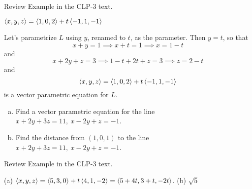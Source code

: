 \begin{hint}
Review Example  in the CLP-3 text.
\end{hint}

\begin{answer}
$\left< x,y,z\right> = \left< 1,0,2\right> +t\left<-1,1,-1 \right>$
\end{answer}

\begin{solution}
Let's parametrize $L$ using $y$, renamed to $t$, as the parameter.
Then $y=t$, so that 
\begin{equation*}
x+y=1
\implies x+t=1
\implies x=1-t
\end{equation*}
and
\begin{equation*}
x+2y+z=3
\implies
1-t + 2t +z =3
\implies z = 2-t
\end{equation*}
and
\begin{equation*}
\left< x,y,z\right> = \left< 1,0,2\right> +t\left<-1,1,-1 \right>
\end{equation*}
is a vector parametric equation for $L$.
\end{solution}

\begin{question}
\begin{enumerate}[(a)]
\item
Find a vector parametric equation for the line
$x+2y+3z=11,\ x-2y+z=-1$. 
\item
Find the distance from $(1,0,1)$ to the line
$x+2y+3z=11,\ x-2y+z=-1$. 
\end{enumerate}
\end{question}

\begin{hint}
Review Example  in the CLP-3 text.
\end{hint}

\begin{answer}
(a) $\left< x,y,z\right>=\left< 5,3,0\right>+t\left< 4,1,-2\right> =\left< 5+4t,3+t,-2t\right>$.
\qquad
(b) $\sqrt{5}$
\end{answer}


